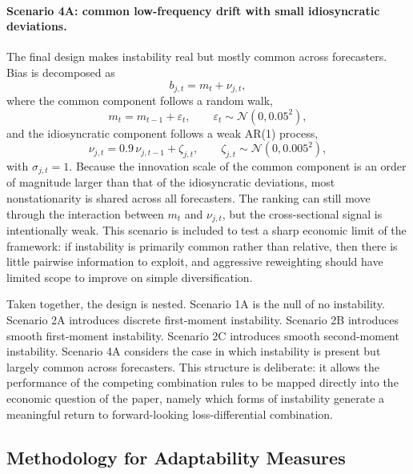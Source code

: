 \documentclass[11pt,a4paper]{article}
\begin{document}
\paragraph{Scenario 4A: common low-frequency drift with small idiosyncratic deviations.}
The final design makes instability real but mostly common across forecasters. Bias is decomposed as
\begin{equation}
b_{j,t}=m_t+\nu_{j,t},
\end{equation}
where the common component follows a random walk,
\begin{equation}
m_t = m_{t-1}+\varepsilon_t,
\qquad
\varepsilon_t \sim \mathcal{N}(0,0.05^2),
\end{equation}
and the idiosyncratic component follows a weak AR(1) process,
\begin{equation}
\nu_{j,t}=0.9\,\nu_{j,t-1}+\zeta_{j,t},
\qquad
\zeta_{j,t}\sim \mathcal{N}(0,0.005^2),
\end{equation}
with $\sigma_{j,t}=1$. Because the innovation scale of the common component is an order of magnitude larger than that of the idiosyncratic deviations, most nonstationarity is shared across all forecasters. The ranking can still move through the interaction between $m_t$ and $\nu_{j,t}$, but the cross-sectional signal is intentionally weak. This scenario is included to test a sharp economic limit of the framework: if instability is primarily common rather than relative, then there is little pairwise information to exploit, and aggressive reweighting should have limited scope to improve on simple diversification.

Taken together, the design is nested. Scenario 1A is the null of no instability. Scenario 2A introduces discrete first-moment instability. Scenario 2B introduces smooth first-moment instability. Scenario 2C introduces smooth second-moment instability. Scenario 4A considers the case in which instability is present but largely common across forecasters. This structure is deliberate: it allows the performance of the competing combination rules to be mapped directly into the economic question of the paper, namely which forms of instability generate a meaningful return to forward-looking loss-differential combination.

\subsection{Methodology for Adaptability Measures}
\end{document}
